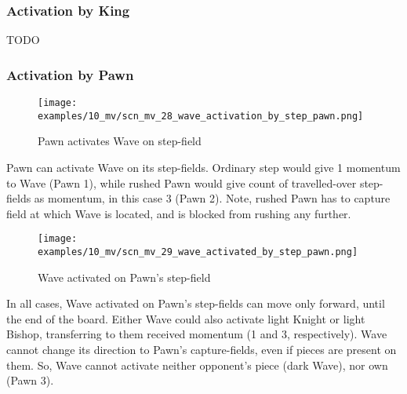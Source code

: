 \subsubsection*{Activation by King}

\huge
TODO
\normalsize

\clearpage %

\subsubsection*{Activation by Pawn}

\vspace*{-1.4\baselineskip}
\noindent
\begin{figure}[!h]
\texttt{[image: examples/10\_mv/scn\_mv\_28\_wave\_activation\_by\_step\_pawn.png]}
\caption{Pawn activates Wave on step-field}
\label{fig:scn_mv_28_wave_activation_by_step_pawn}
\end{figure}

Pawn can activate Wave on its step-fields. Ordinary step would give 1 momentum to
Wave (Pawn 1), while rushed Pawn would give count of travelled-over step-fields as
momentum, in this case 3 (Pawn 2). Note, rushed Pawn has to capture field at which
Wave is located, and is blocked from rushing any further.

\clearpage %

\vspace*{-2.1\baselineskip}
\noindent
\begin{figure}[!h]
\texttt{[image: examples/10\_mv/scn\_mv\_29\_wave\_activated\_by\_step\_pawn.png]}
\caption{Wave activated on Pawn's step-field}
\label{fig:scn_mv_29_wave_activated_by_step_pawn}
\end{figure}

In all cases, Wave activated on Pawn's step-fields can move only forward, until the end
of the board. Either Wave could also activate light Knight or light Bishop, transferring
to them received momentum (1 and 3, respectively). Wave cannot change its direction to
Pawn's capture-fields, even if pieces are present on them. So, Wave cannot activate neither
opponent's piece (dark Wave), nor own (Pawn 3).


